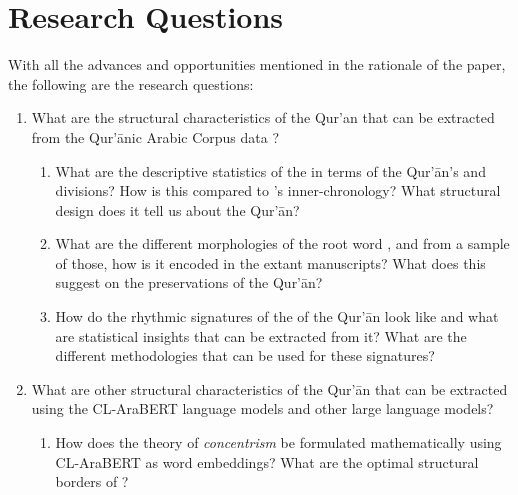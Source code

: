 \section{Research Questions}\label{sec:research_questions}
With all the advances and opportunities mentioned in the rationale of the paper, the following are the research questions:
\begin{enumerate}
    \item What are the structural characteristics of the Qur'an that can be extracted from the Qur'\=anic Arabic Corpus data \cite{dukes-habash-2010-morphological}?
    \begin{enumerate}
        \item What are the descriptive statistics of the   in terms of the Qur'\=an's   and   divisions? How is this compared to 's inner-chronology? What structural design does it tell us about the Qur'\=an?
        
        \item What are the different morphologies of the root word  , and from a sample of those, how is it encoded in the extant manuscripts? What does this suggest on the preservations of the Qur'\=an?
        
        \item How do the rhythmic signatures of the   of the Qur'\=an look like and what are statistical insights that can be extracted from it? What are the different methodologies that can be used for these signatures?

    \end{enumerate}
    
    \item What are other structural characteristics of the Qur'\=an that can be extracted using the CL-AraBERT language models and other large language models?
    \begin{enumerate}
        \item How does the theory of \textit{concentrism} be formulated mathematically using CL-AraBERT as word embeddings? What are the optimal structural borders of  ?
        

\end{enumerate}
\end{enumerate}
